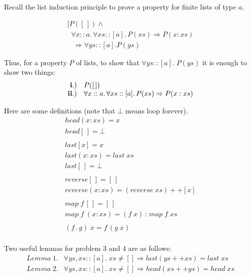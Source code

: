 \documentclass[11pt]{article}
\begin{document}

Recall the list induction principle to prove a property for finite lists of type $a$.

\[\begin{array}{l}

[P([\,]) \wedge \\
\;\;\forall{}x::a.\,\forall xs::[a].\, P(xs) \Rightarrow P(x:xs) \\
\;\;\; \Rightarrow \forall{}ys::[a]. P(ys)
\end{array}\]

Thus, for a property $P$ of lists, to show that $\forall{}ys::[a].\; P(ys)$ it
is enough to show two things:
\[\begin{array}{rl}
{\bf{i.)}} & P([\,]) \\
{\bf{ii.)}} & \forall x::a.\,\forall{}xs::[a].\, P(xs) \Rightarrow P(x:xs)\\
\end{array}\]

Here are some definitions (note that $\bot$ means loop forever).
\[\begin{array}{l}

head (x:xs) = x \\
head [\,] = \bot \\
\ \\
last [x] = x \\
last (x:xs) = last \; xs \\
last [\,] = \bot \\
\ \\
reverse [\,] = [\,]\\
reverse (x:xs) = (reverse \; xs ) ++ [x] \\
\ \\
map\; f\, [\,] = [\,] \\
map \; f \; (x:xs) = (f\; x)\, :\, map \; f \; xs \\
\ \\
(f\, .\, g)\; x = f\, (g\; x)\\

\end{array}\]


Two useful lemmas for problem 3 and 4 are as follows:
\[\begin{array}{ll}
Lemma\; 1. & \forall ys,xs ::[a].\; xs \not= [] \Rightarrow last (ys ++ xs) = last \; xs\\
Lemma\; 2. & \forall ys,xs ::[a].\; xs \not= [] \Rightarrow head (xs ++ ys) = head \; xs\\
\end{array}\]
\end{document}
